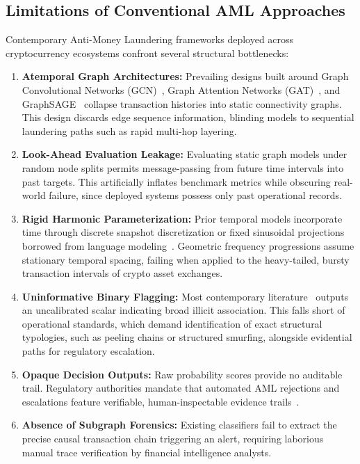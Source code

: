 \subsection{Limitations of Conventional AML Approaches}
\label{subsec:limitations}

Contemporary Anti-Money Laundering frameworks deployed across cryptocurrency ecosystems confront several structural bottlenecks:

\begin{enumerate}
	\item \textbf{Atemporal Graph Architectures:} Prevailing designs built around Graph Convolutional Networks (GCN)~\cite{kipf2017gcn}, Graph Attention Networks (GAT)~\cite{velivckovic2018gat}, and GraphSAGE~\cite{hamilton2017graphsage} collapse transaction histories into static connectivity graphs. This design discards edge sequence information, blinding models to sequential laundering paths such as rapid multi-hop layering.

	\item \textbf{Look-Ahead Evaluation Leakage:} Evaluating static graph models under random node splits permits message-passing from future time intervals into past targets. This artificially inflates benchmark metrics while obscuring real-world failure, since deployed systems possess only past operational records.

	\item \textbf{Rigid Harmonic Parameterization:} Prior temporal models incorporate time through discrete snapshot discretization or fixed sinusoidal projections borrowed from language modeling~\cite{vaswani2017attention}. Geometric frequency progressions assume stationary temporal spacing, failing when applied to the heavy-tailed, bursty transaction intervals of crypto asset exchanges.

	\item \textbf{Uninformative Binary Flagging:} Most contemporary literature~\cite{weber2019anti, pareja2020evolvegcn} outputs an uncalibrated scalar indicating broad illicit association. This falls short of operational standards, which demand identification of exact structural typologies, such as peeling chains or structured smurfing, alongside evidential paths for regulatory escalation.

	\item \textbf{Opaque Decision Outputs:} Raw probability scores provide no auditable trail. Regulatory authorities mandate that automated AML rejections and escalations feature verifiable, human-inspectable evidence trails~\cite{giese2022explainable}.

	\item \textbf{Absence of Subgraph Forensics:} Existing classifiers fail to extract the precise causal transaction chain triggering an alert, requiring laborious manual trace verification by financial intelligence analysts.
\end{enumerate}

